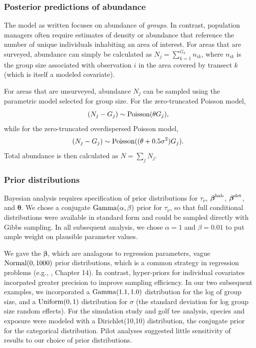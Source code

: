 \documentclass[10pt]{article}
\begin{document}
\subsubsection*{Posterior predictions of abundance}

The model as written focuses on abundance of \emph{groups}.  In contrast, population managers often require estimates of density or abundance that reference the number of unique individuals inhabiting an area of interest.  For areas that are surveyed, abundance can simply be calculated as $N_j=\sum_{k=1}^{G_k} n_{ik}$, where $n_{ik}$ is the group size associated with observation $i$ in the area covered by transect $k$ (which is itself a modeled covariate).

For areas that are unsurveyed, abundance $N_j$ can be sampled using the parametric model selected for group size.  For the zero-truncated Poisson model,
$$(N_j-G_j) \sim {\rm Poisson}(\theta G_j),
$$
while for the zero-truncated overdispersed Poisson model,
$$(N_j-G_j) \sim {\rm Poisson}((\theta+0.5\sigma^2) G_j).$$
Total abundance is then calculated as $N=\sum_j N_j$.

\subsubsection*{Prior distributions}

Bayesian analysis requires specification of prior distributions for $\tau_\nu$, $\boldsymbol{\beta}^{\rm hab}$, $\boldsymbol{\beta}^{\rm det}$, and $\boldsymbol{\theta}$.  We chose a conjugate ${\rm Gamma}(\alpha,\beta)$ prior for $\tau_\nu$, so that full conditional distributions were available in standard form and could be sampled directly with Gibbs sampling. In all subsequent analysis, we chose $\alpha=1$ and $\beta=0.01$ to put ample weight on plausible parameter values.

We gave the $\boldsymbol{\beta}$, which are analagous to regression parameters, vague ${\rm Normal}(0,1000)$ prior distributions, which is a common strategy in regression problems (e.g., \cite{GelmanEtAl2004}, Chapter 14).  In contrast, hyper-priors for individual covariates incorpated greater precision to improve sampling efficiency.  In our two subsequent examples, we incorporated a ${\rm Gamma}(1.1,1.0)$ distribution for the log of group size, and a ${\rm Uniform}(0,1)$ distribution for $\sigma$ (the standard deviation for log group size random effects). For the simulation study and golf tee analysis, species and exposure were modeled with a Dirichlet(10,10) distribution, the conjugate prior for the categorical distribution.  Pilot analyses suggested little sensitivity of results to our choice of prior distributions.
\end{document}
